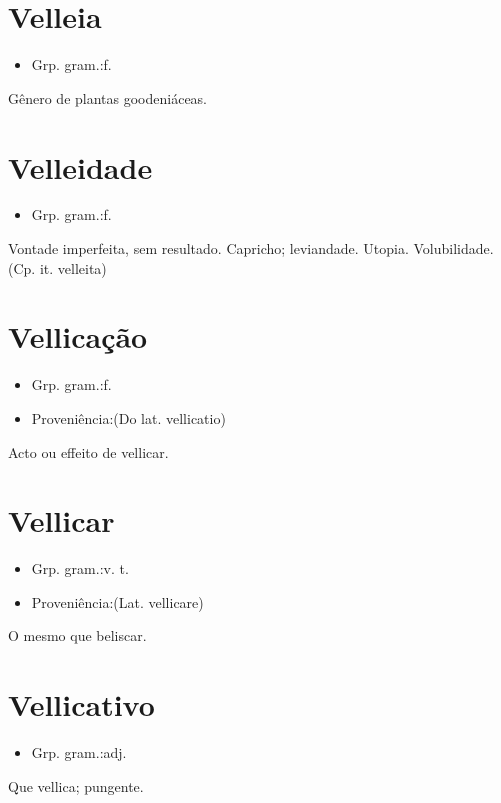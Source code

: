 \documentclass{article}
\begin{document}
\section{Velleia}
\begin{itemize}
\item {Grp. gram.:f.}
\end{itemize}
Gênero de plantas goodeniáceas.
\section{Velleidade}
\begin{itemize}
\item {Grp. gram.:f.}
\end{itemize}
Vontade imperfeita, sem resultado.
Capricho; leviandade.
Utopia.
Volubilidade.
(Cp. it. \textunderscore velleita\textunderscore )
\section{Vellicação}
\begin{itemize}
\item {Grp. gram.:f.}
\end{itemize}
\begin{itemize}
\item {Proveniência:(Do lat. \textunderscore vellicatio\textunderscore )}
\end{itemize}
Acto ou effeito de vellicar.
\section{Vellicar}
\begin{itemize}
\item {Grp. gram.:v. t.}
\end{itemize}
\begin{itemize}
\item {Proveniência:(Lat. \textunderscore vellicare\textunderscore )}
\end{itemize}
O mesmo que \textunderscore beliscar\textunderscore .
\section{Vellicativo}
\begin{itemize}
\item {Grp. gram.:adj.}
\end{itemize}
Que vellica; pungente.
\end{document}
